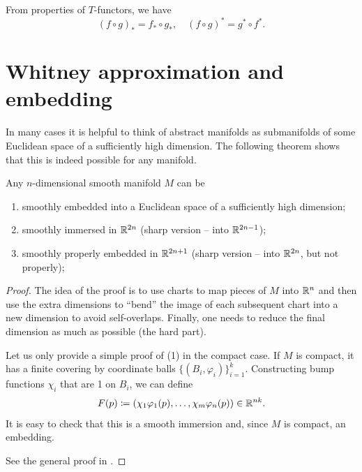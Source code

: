 \begin{rem}
    From properties of $T$-functors, we have 
    \[
    (f\circ g)_\ast=f_\ast\circ g_\ast,\quad (f\circ g)^\ast=g^\ast\circ f^\ast.
    \]
\end{rem}






\section{Whitney approximation and embedding}

In many cases it is helpful to think of abstract manifolds as submanifolds of some Euclidean space of a sufficiently high dimension. The following theorem shows that this is indeed possible for any manifold.

\begin{thm}\label{thm whitney embedding}
    Any $n$-dimensional smooth manifold $M$ can be
    \begin{enumerate}[label=(\arabic*)]
        \item smoothly embedded into a Euclidean space of a sufficiently high dimension;
        \item smoothly immersed in $\mathbb{R}^{2n}$ (sharp version -- into $\mathbb{R}^{2n-1}$);
        \item smoothly properly embedded in $\mathbb{R}^{2n+1}$ (sharp version -- into $\mathbb{R}^{2n}$, but not properly);
    \end{enumerate}
    \end{thm}
\begin{proof}
    The idea of the proof is to use charts to map pieces of $M$ into $\mathbb{R}^n$ and then use the extra dimensions to ``bend'' the image of each subsequent chart into a new dimension to avoid self-overlaps. Finally, one needs to reduce the final dimension as much as possible (the hard part).

    Let us only provide a simple proof of (1) in the compact case. If $M$ is compact, it has a finite covering by coordinate balls $\{(B_i,\varphi_i)\}_{i=1}^k$. Constructing bump functions $\chi_i$ that are 1 on $B_i$, we can define
    \[
        F(p)\coloneqq (\chi_1\varphi_1(p),\ldots, \chi_m\varphi_n(p))\in\mathbb{R}^{nk}.
    \]
    It is easy to check that this is a smooth immersion and, since $M$ is compact, an embedding.

    See the general proof in \cite[Thm. 6.15]{Lee}.
\end{proof}

